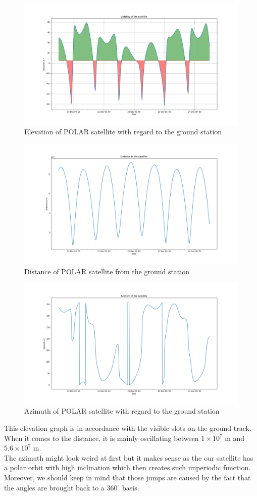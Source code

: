 \documentclass[a4paper,12pt,calibri,oneside,openany]{book}
\theoremstyle{break}
\begin{document}
\begin{figure}[H]
	\centering
	\includegraphics[width=0.6\linewidth]{elevation}
	\caption{Elevation of POLAR satellite with regard to the ground station}
\end{figure}

\begin{figure}[H]
	\centering
	\includegraphics[width=0.6\linewidth]{distance}
	\caption{Distance of POLAR satellite from the ground station}
\end{figure}

\begin{figure}[H]
	\centering
	\includegraphics[width=0.6\linewidth]{azimuth}
	\caption{Azimuth of POLAR satellite with regard to the ground station}
\end{figure}

This elevation graph is in accordance with the visible slots on the ground track. When it comes to the distance, it is mainly oscillating between $1\times10^7$ m and $5.6\times 10^7$ m.\\

 The azimuth might look weird at first but it makes sense as the our satellite has a polar orbit with high inclination which then creates such unperiodic function. Moreover, we should keep in mind that those jumps are caused by the fact that the angles are brought back to a $360^\circ$ basis.
\newpage
\end{document}
